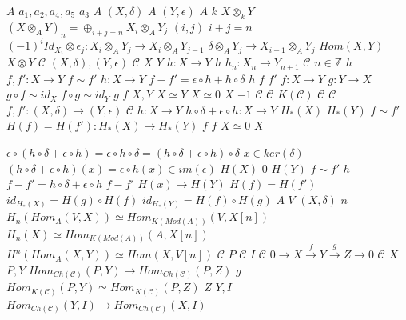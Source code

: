 \documentclass{article}
\begin{document}
$A$
$a_1,a_2,a_4,a_5$
$a_3$
$A$
$(X,\delta)$
$A$
$(Y,\epsilon)$
$A$
$k$
$X \otimes_k Y$
$(X \otimes_A Y)_n=\oplus_{i+j=n}X_i \otimes_AY_j$
$(i,j)$
$i+j=n$
$(-1)^iId_{X_i}\otimes \epsilon_j:X_i \otimes_A Y_j \rightarrow X_i \otimes_A Y_{j-1}$
$\delta \otimes_A Y_j \rightarrow X_{i-1} \otimes_A Y_j$
$Hom(X,Y)$
$X \otimes Y$
$\mathcal{C}$
$(X,\delta),(Y,\epsilon)$
$\mathcal{C}$
$X$
$Y$
$h:X \rightarrow Y$
$h$
$h_n:X_n \rightarrow Y_{n+1}$
$\mathcal{C}$
$n \in \mathbb{Z}$
$h$
$f,f':X \rightarrow Y$
$f \sim f'$
$h:X \rightarrow Y$
$f-f'=\epsilon \circ h+h \circ \delta$
$h$
$f$
$f'$
$f:X \rightarrow Y$
$g:Y \rightarrow X$
$g \circ f \sim id_X$
$f \circ g \sim id_Y$
$g$
$f$
$X,Y$
$X \simeq Y$
$X \simeq 0$
$X$
$-1$
$\mathcal{C}$
$\mathcal{C}$
$K(\mathcal{C})$
$\mathcal{C}$
$\mathcal{C}$
$f,f':(X,\delta) \rightarrow (Y,\epsilon)$
$\mathcal{C}$
$h:X \rightarrow Y$
$h \circ \delta + \epsilon \circ h: X \rightarrow Y$
$H_*(X)$
$H_*(Y)$
$f \sim f'$
$H(f)=H(f'):H_*(X) \rightarrow H_*(Y)$
$f$
$f$
$X \simeq 0$
$X$
$\epsilon \circ(h \circ \delta+\epsilon \circ h)=\epsilon \circ h \circ \delta=(h\circ \delta + \epsilon \circ h) \circ \delta$
$x \in ker(\delta)$
$(h \circ \delta + \epsilon \circ h)(x)=\epsilon \circ h(x) \in im(\epsilon)$
$H(X)$
$0$
$H(Y)$
$f \sim f'$
$h$
$f-f'=h \circ \delta + \epsilon \circ h$
$f-f'$
$H(x) \rightarrow H(Y)$
$H(f)=H(f')$
$id_{H_*(X)}=H(g)\circ H(f)$
$id_{H_*(Y)}=H(f) \circ H(g)$
$A$
$V$
$(X,\delta)$
$n$
$H_n(Hom_A(V,X)) \simeq Hom_{K(Mod(A))}(V,X[n])$
$H_n(X) \simeq Hom_{K(Mod(A))}(A,X[n])$
$H^n(Hom_A(X,Y)) \simeq Hom(X,V[n])$
$\mathcal{C}$
$P$
$\mathcal{C}$
$I$
$\mathcal{C}$
$0 \longrightarrow X \stackrel{f}{\longrightarrow} Y \stackrel{g}{\longrightarrow} Z \longrightarrow 0$
$\mathcal{C}$
$X$
$P,Y$
$Hom_{Ch(\mathcal{C})}(P,Y) \rightarrow Hom_{Ch(\mathcal{C})}(P,Z)$
$g$
$Hom_{K(\mathcal{C})}(P,Y) \simeq Hom_{K(\mathcal{C})}(P,Z)$
$Z$
$Y,I$
$Hom_{Ch(\mathcal{C})}(Y,I) \rightarrow Hom_{Ch(\mathcal{C})}(X,I)$
\end{document}
